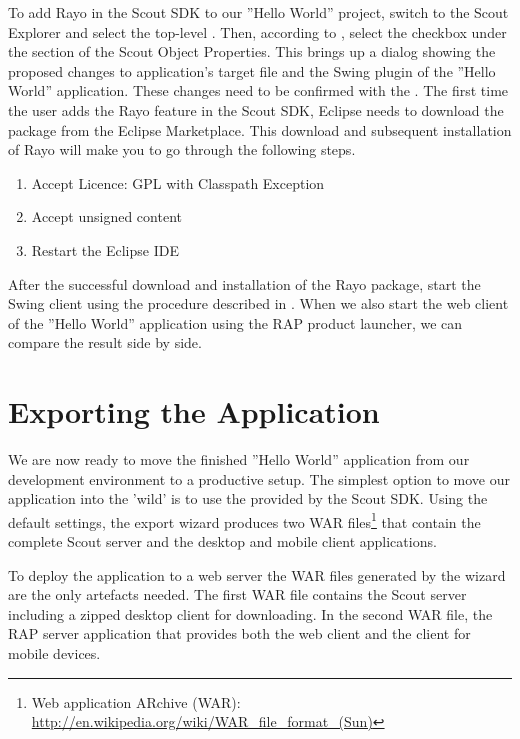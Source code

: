 \documentclass[a4paper,10pt,twoside]{book}
\begin{document}
To add Rayo in the Scout SDK to our ''Hello World'' project, switch to the Scout Explorer and select the top-level .
Then, according to , select the checkbox  under the  section of the Scout Object Properties.
This brings up a dialog showing the proposed changes to application's target file and the Swing plugin of the ''Hello World'' application. 
These changes need to be confirmed with the .
The first time the user adds the Rayo feature in the Scout SDK, Eclipse needs to download the package from the Eclipse Marketplace.
This download and subsequent installation of Rayo will make you to go through the following steps.

\begin{enumerate}
  \item Accept Licence: GPL with Classpath Exception
  \item Accept unsigned content
  \item Restart the Eclipse IDE
\end{enumerate}

After the successful download and installation of the Rayo package, start the Swing client using the procedure described in .
When we also start the web client of the ''Hello World'' application using the RAP product launcher, we can compare the result side by side.

\section{Exporting the Application}

We are now ready to move the finished ''Hello World'' application from our development environment to a productive setup.
The simplest option to move our application into the 'wild' is to use the  provided by the Scout SDK.
Using the default settings, the export wizard produces two WAR files\footnote{
Web application ARchive (WAR): \url{http://en.wikipedia.org/wiki/WAR_file_format_(Sun)}
}
that contain the complete Scout server and the desktop and mobile client applications.

To deploy the application to a web server the WAR files generated by the wizard are the only artefacts needed.
The first WAR file contains the Scout server including a zipped desktop client for downloading.
In the second WAR file, the RAP server application that provides both the web client and the client for mobile devices.
\end{document}
